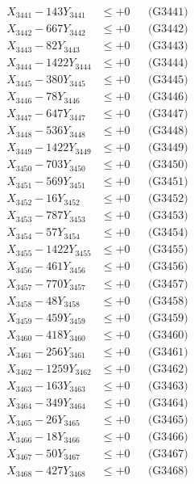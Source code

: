 \documentclass[a4paper,10pt]{article}
\begin{document}
{\begin{align}
\allowbreak
X_{3441} - 143Y_{3441} &\leq +0 && \text{(G3441)} \\
X_{3442} - 667Y_{3442} &\leq +0 && \text{(G3442)} \\
X_{3443} - 82Y_{3443} &\leq +0 && \text{(G3443)} \\
X_{3444} - 1422Y_{3444} &\leq +0 && \text{(G3444)} \\
X_{3445} - 380Y_{3445} &\leq +0 && \text{(G3445)} \\
X_{3446} - 78Y_{3446} &\leq +0 && \text{(G3446)} \\
X_{3447} - 647Y_{3447} &\leq +0 && \text{(G3447)} \\
X_{3448} - 536Y_{3448} &\leq +0 && \text{(G3448)} \\
X_{3449} - 1422Y_{3449} &\leq +0 && \text{(G3449)} \\
X_{3450} - 703Y_{3450} &\leq +0 && \text{(G3450)} \\
\allowbreak
X_{3451} - 569Y_{3451} &\leq +0 && \text{(G3451)} \\
X_{3452} - 16Y_{3452} &\leq +0 && \text{(G3452)} \\
X_{3453} - 787Y_{3453} &\leq +0 && \text{(G3453)} \\
X_{3454} - 57Y_{3454} &\leq +0 && \text{(G3454)} \\
X_{3455} - 1422Y_{3455} &\leq +0 && \text{(G3455)} \\
X_{3456} - 461Y_{3456} &\leq +0 && \text{(G3456)} \\
X_{3457} - 770Y_{3457} &\leq +0 && \text{(G3457)} \\
X_{3458} - 48Y_{3458} &\leq +0 && \text{(G3458)} \\
X_{3459} - 459Y_{3459} &\leq +0 && \text{(G3459)} \\
X_{3460} - 418Y_{3460} &\leq +0 && \text{(G3460)} \\
\allowbreak
X_{3461} - 256Y_{3461} &\leq +0 && \text{(G3461)} \\
X_{3462} - 1259Y_{3462} &\leq +0 && \text{(G3462)} \\
X_{3463} - 163Y_{3463} &\leq +0 && \text{(G3463)} \\
X_{3464} - 349Y_{3464} &\leq +0 && \text{(G3464)} \\
X_{3465} - 26Y_{3465} &\leq +0 && \text{(G3465)} \\
X_{3466} - 18Y_{3466} &\leq +0 && \text{(G3466)} \\
X_{3467} - 50Y_{3467} &\leq +0 && \text{(G3467)} \\
X_{3468} - 427Y_{3468} &\leq +0 && \text{(G3468)} \\

\end{align}}
\end{document}
